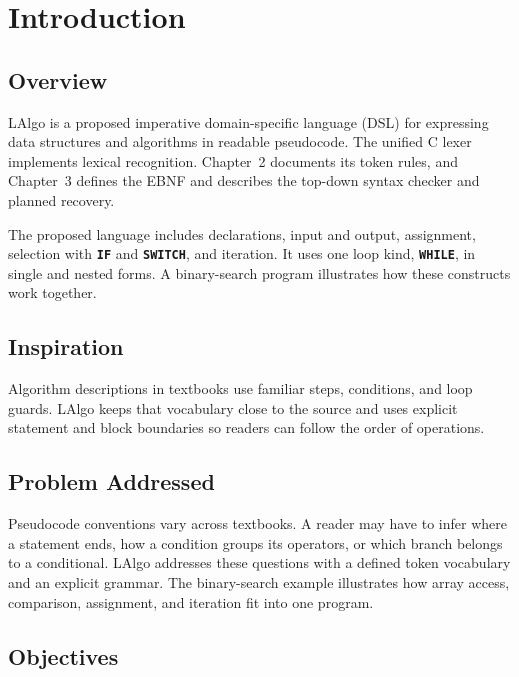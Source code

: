 \documentclass[11pt,a4paper]{article}
\newcommand{\kw}[1]{\texttt{\bfseries\color{pupmaroon}#1}}
\newcommand{\sectionrule}{}
\begin{document}
\hypersetup{pageanchor=true}
\begingroup
\small
\setlength{\cftbeforetoctitleskip}{0pt}
\setlength{\cftaftertoctitleskip}{8pt}
\tableofcontents
\endgroup
\clearpage
{}

\section{Introduction}
\sectionrule

\subsection{Overview}

LAlgo is a proposed imperative domain-specific language (DSL) for expressing data structures and algorithms in readable pseudocode. The unified C lexer implements lexical recognition. Chapter~2 documents its token rules, and Chapter~3 defines the EBNF and describes the top-down syntax checker and planned recovery.

The proposed language includes declarations, input and output, assignment, selection with \kw{IF} and \kw{SWITCH}, and iteration. It uses one loop kind, \kw{WHILE}, in single and nested forms. A binary-search program illustrates how these constructs work together.

\subsection{Inspiration}

Algorithm descriptions in textbooks use familiar steps, conditions, and loop guards. LAlgo keeps that vocabulary close to the source and uses explicit statement and block boundaries so readers can follow the order of operations.

\subsection{Problem Addressed}

Pseudocode conventions vary across textbooks. A reader may have to infer where a statement ends, how a condition groups its operators, or which branch belongs to a conditional. LAlgo addresses these questions with a defined token vocabulary and an explicit grammar. The binary-search example illustrates how array access, comparison, assignment, and iteration fit into one program.

\subsection{Objectives}
\end{document}
